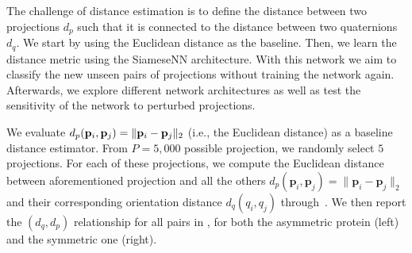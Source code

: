 
The challenge of distance estimation is to define the distance between two projections $d_p$ such that it is connected to the distance between two quaternions $d_q$. We start by using the Euclidean distance as the baseline. Then, we learn the distance metric using the SiameseNN architecture. With this network we aim to classify the new unseen pairs of projections without training the network again. Afterwards, we explore different network architectures as well as test the sensitivity of the network to perturbed projections.



We evaluate $d_p(\mathbf{p}_i, \mathbf{p}_j) = \Vert \mathbf{p}_i - \mathbf{p}_j \Vert_2$ (i.e., the Euclidean distance) as a baseline distance estimator.
From $P = 5,000$ possible projection, we randomly select $5$ projections.
For each of these projections, we compute the Euclidean distance between aforementioned projection and all the others $d_p(\mathbf{p}_i,\mathbf{p}_j)=\lVert\mathbf{p}_i-\mathbf{p}_j\rVert_2$ and their corresponding orientation distance $d_q(q_i,q_j)$ through~.
We then report the $(d_q,d_p)$ relationship for all pairs in , for both the asymmetric protein (left) and the symmetric one (right).

